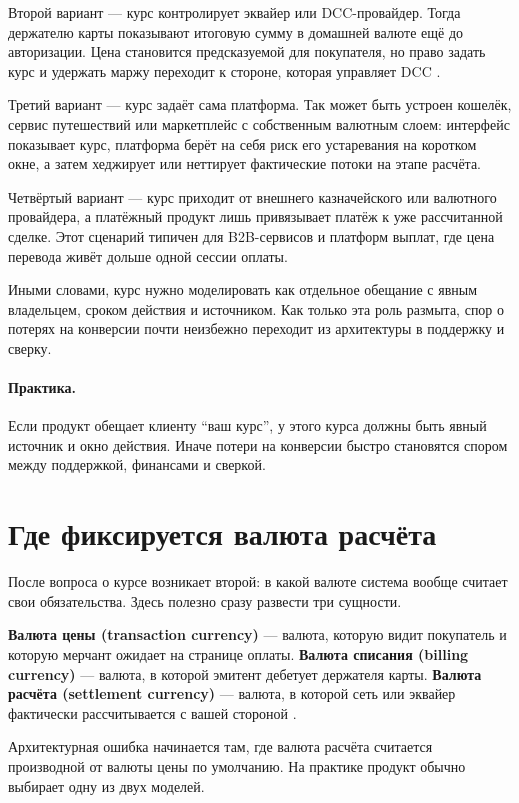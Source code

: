 Второй вариант --- курс контролирует эквайер или DCC-провайдер.
Тогда держателю карты показывают итоговую сумму в домашней
валюте ещё до авторизации. Цена становится предсказуемой
для покупателя, но право задать курс и удержать маржу
переходит к стороне, которая управляет DCC
\cite{visa-core-rules,mc-dcc-guide}.

Третий вариант --- курс задаёт сама платформа. Так может быть
устроен кошелёк, сервис путешествий или маркетплейс
с собственным валютным слоем: интерфейс показывает курс,
платформа берёт на себя риск его устаревания на коротком
окне, а затем хеджирует или неттирует фактические потоки
на этапе расчёта.

Четвёртый вариант --- курс приходит от внешнего казначейского
или валютного провайдера, а платёжный продукт лишь привязывает
платёж к уже рассчитанной сделке. Этот сценарий типичен
для B2B-сервисов и платформ выплат, где цена перевода живёт
дольше одной сессии оплаты.

Иными словами, курс нужно моделировать как отдельное обещание
с явным владельцем, сроком действия и источником. Как только
эта роль размыта, спор о потерях на конверсии почти неизбежно
переходит из архитектуры в поддержку и сверку.

\paragraph{Практика.}
Если продукт обещает клиенту \enquote{ваш курс}, у этого курса должны быть явный источник и окно действия. Иначе потери на конверсии быстро становятся спором между поддержкой, финансами и сверкой.


\section{Где фиксируется валюта расчёта}
\label{sec:mc-settlement}

После вопроса о курсе возникает второй: в какой валюте система
вообще считает свои обязательства. Здесь полезно сразу развести
три сущности.

\textbf{Валюта цены (transaction currency)} --- валюта,
которую видит покупатель и которую мерчант ожидает
на странице оплаты.
\textbf{Валюта списания (billing currency)} --- валюта,
в которой эмитент дебетует держателя карты.
\textbf{Валюта расчёта (settlement currency)} --- валюта,
в которой сеть или эквайер фактически рассчитывается с вашей
стороной \cite{visa-core-rules,mc-rules}.

Архитектурная ошибка начинается там, где валюта расчёта
считается производной от валюты цены по умолчанию.
На практике продукт обычно выбирает одну из двух моделей.

